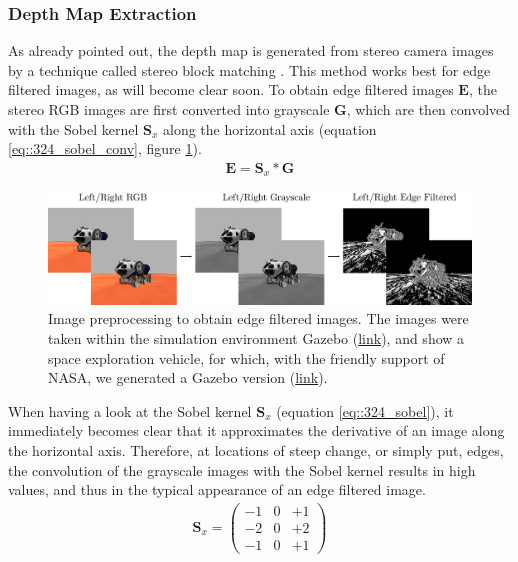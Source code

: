 \subsubsection{Depth Map Extraction}
As already pointed out, the depth map is generated from stereo camera images by a technique called stereo block matching \cite{hamzah2010sum}. This method works best for edge filtered images, as will become clear soon. To obtain edge filtered images $\bm{E}$, the stereo RGB images are first converted into grayscale $\bm{G}$, which are then convolved with the Sobel kernel $\bm{S}_x$ along the horizontal axis \cite{sobel2014an} (equation \ref{eq::324_sobel_conv}, figure \ref{fig::324_image_preprocessing}). 
\begin{align}
	\bm{E} = \bm{S}_x*\bm{G}
	\label{eq::324_sobel_conv}
\end{align}
\begin{figure}[h]
	\centering
	\includegraphics[scale=.28]{chapters/03_background/img/image_preprocessing.png}
	\caption{Image preprocessing to obtain edge filtered images. The images were taken within the simulation environment Gazebo (\href{http://gazebosim.org/}{link}), and show a space exploration vehicle, for which, with the friendly support of NASA, we generated a Gazebo version (\href{https://github.com/mhubii/gazebo_models}{link}).}
	\label{fig::324_image_preprocessing}
\end{figure}
When having a look at the Sobel kernel $\bm{S}_x$ (equation \ref{eq::324_sobel}), it immediately becomes clear that it approximates the derivative of an image along the horizontal axis. Therefore, at locations of steep change, or simply put, edges, the convolution of the grayscale images with the Sobel kernel results in high values, and thus in the typical appearance of an edge filtered image.
\begin{align}
	\bm{S}_x=
	\begin{pmatrix}
		-1 & 0 & +1 \\
		-2 & 0 & +2 \\
		-1 & 0 & +1
	\end{pmatrix}
	\label{eq::324_sobel}
\end{align}
